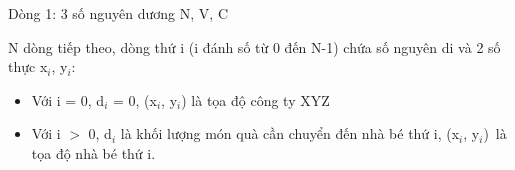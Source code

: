 Dòng 1: 3 số nguyên dương N, V, C

N dòng tiếp theo, dòng thứ i (i đánh số từ 0 đến N-1) chứa số nguyên di và 2 số thực x$_i$, y$_i$:
\begin{itemize}
	\item Với i = 0, d$_i$ = 0, (x$_i$, y$_i$) là tọa độ công ty XYZ
	\item Với i $>$ 0, d$_i$ là khối lượng món quà cần chuyển đến nhà bé thứ i, (x$_i$, y$_i$) là tọa độ nhà bé thứ i.
\end{itemize}